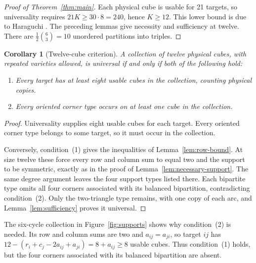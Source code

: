 \documentclass[11pt]{article}
\newtheorem{corollary}[theorem]{Corollary}
\begin{document}
\begin{proof}[Proof of Theorem~\ref{thm:main}]
Each physical cube is usable for 21 targets, so universality requires
$21K\ge30\cdot8=240$, hence $K\ge12$. This lower bound is due to
Haraguchi \cite[Lemma~2]{H}. The preceding lemmas give necessity and sufficiency at
twelve. There are $\frac12\binom63=10$ unordered partitions into triples.
\end{proof}

\begin{corollary}[Twelve-cube criterion]
\label{cor:twelve-criterion}
A collection of twelve physical cubes, with repeated varieties allowed,
is universal if and only if both of the following hold:
\begin{enumerate}
\item Every target has at least eight usable cubes in the collection,
counting physical copies.
\item Every oriented corner type occurs on at least one cube in the
collection.
\end{enumerate}
\end{corollary}
\begin{proof}
Universality supplies eight usable cubes for each target. Every oriented
corner type belongs to some target, so it must occur in the collection.

Conversely, condition~(1) gives the inequalities of
Lemma~\ref{lem:row-bound}. At size twelve these force every row and column
sum to equal two and the support to be symmetric, exactly as in the proof
of Lemma~\ref{lem:necessary-support}. The same degree argument leaves the
four support types listed there. Each bipartite type omits all four corners
associated with its balanced bipartition, contradicting condition~(2).
Only the two-triangle type remains, with one copy of each arc, and
Lemma~\ref{lem:sufficiency} proves it universal.
\end{proof}

The six-cycle collection in Figure~\ref{fig:supports} shows why condition~(2)
is needed. Its row and column sums are two and $a_{ij}=a_{ji}$, so target
$ij$ has $12-(r_i+c_j-2a_{ij}+a_{ji})=8+a_{ij}\ge8$ usable cubes.
Thus condition~(1) holds, but the four corners associated with its balanced
bipartition are absent.
\end{document}
